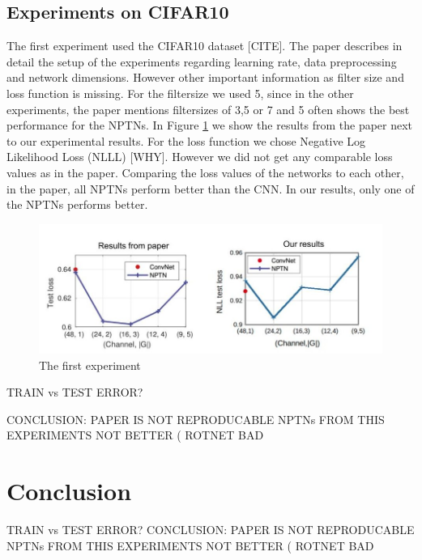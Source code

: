 \documentclass{llncs}
\begin{document}
\subsection{Experiments on CIFAR10}
The first experiment used the CIFAR10 dataset [CITE]. 
The paper describes in detail the setup of the experiments regarding learning rate, data preprocessing and network dimensions. However other important information as filter size and loss function is missing. 
For the filtersize we used 5, since in the other experiments, the paper mentions  filtersizes of 3,5 or 7 and 5 often shows the best performance for the NPTNs. 
In Figure \ref{pic:first_experiment} we show the results from the paper next to our experimental results. For the loss function we chose Negative Log Likelihood Loss (NLLL) [WHY]. 
However we did not get any comparable loss values as in the paper. Comparing the loss values of the networks to each other, in the paper, all NPTNs perform better than the CNN. In our results, only one of the NPTNs performs better.


\begin{figure}
	\begin{center}
	\includegraphics[scale=0.35]{result_images/experiment1.jpg}
	\caption{The first experiment}
	\label{pic:first_experiment}
	\end{center}
\end{figure}

TRAIN vs TEST ERROR?

CONCLUSION: PAPER IS NOT REPRODUCABLE
NPTNs FROM THIS EXPERIMENTS NOT BETTER 
(
ROTNET BAD

\section{Conclusion}
TRAIN vs TEST ERROR?
CONCLUSION: PAPER IS NOT REPRODUCABLE NPTNs FROM THIS
EXPERIMENTS NOT BETTER ( ROTNET BAD
\end{document}
